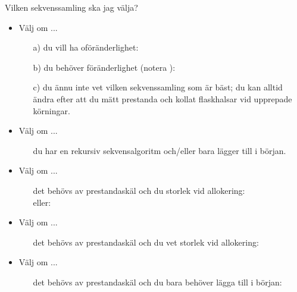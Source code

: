 \begin{Slide}{Vilken sekvenssamling ska jag välja?}\SlideFontSmall
\vspace{-0.5em}
\begin{itemize}
\item Välj  om ...
  \begin{itemize}\SlideFontTiny
  \item[a)] du vill ha oföränderlighet: 
  \item[b)] du behöver föränderlighet (notera ):\\ 
  \item[c)] du ännu inte vet vilken sekvenssamling som är bäst; du kan alltid ändra efter att du mätt prestanda och kollat flaskhalsar vid upprepade körningar.
  \end{itemize}

\item Välj  om ...
  \begin{itemize}\SlideFontTiny
  \item[] du har en rekursiv sekvensalgoritm och/eller bara lägger till i början.
  \end{itemize}


\item Välj  om ...
  \begin{itemize}\SlideFontTiny
  \item[] det behövs av prestandaskäl och du  storlek vid allokering:\\
    eller:
  \end{itemize}

\item Välj  om ...
  \begin{itemize}\SlideFontTiny
  \item[] det behövs av prestandaskäl och du  vet storlek vid allokering:\\
  \end{itemize}

\item Välj  om ...
  \begin{itemize}\SlideFontTiny
  \item[] det behövs av prestandaskäl och du bara behöver lägga till i början:\\ 
  \end{itemize}

\end{itemize}
\end{Slide}


